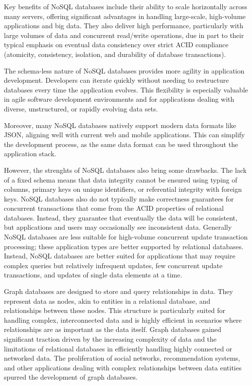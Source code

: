 Key benefits of NoSQL databases include their ability to scale horizontally across many servers, offering significant advantages in handling large-scale, high-volume applications and big data. They also deliver high performance, particularly with large volumes of data and concurrent read/write operations, due in part to their typical emphasis on eventual data consistency over strict ACID compliance (atomicity, consistency, isolation, and durability of database transactions).

The schema-less nature of NoSQL databases provides more agility in application development. Developers can iterate quickly without needing to restructure databases every time the application evolves. This flexibility is especially valuable in agile software development environments and for applications dealing with diverse, unstructured, or rapidly evolving data sets.

Moreover, many NoSQL databases natively support modern data formats like JSON, aligning well with current web and mobile applications. This can simplify the development process, as the same data format can be used throughout the application stack.

However, the strenghts of NoSQL databases also bring some drawbacks. The lack of a fixed schema means that data integrity cannot be ensured using typing of columns, primary keys on unique identifiers, or referential integrity with foreign keys. NoSQL databases also do not typically make correctness guarantees for concurrent transactions that come from the ACID properties of relational databases. Instead, they guarantee that eventually the data will be consistent, but applications and users may occasionally see inconsistent data. Generally NoSQL databases are less suitable for high-volume concurrent update transaction processing; these application types are better supported by relational databases. Instead, NoSQL databases are better suited for applications that may require complex queries but relatively infrequent updates, few concurrent update transactions, and updates of single data elements at a time.

Graph databases are designed to store and query relationships in data. They represent data as nodes, akin to entities in a relational database, and relationships between these nodes. This structure is particularly suited for handling complex, interconnected data and is highly efficient in scenarios where relationships are as important as the data itself. Graph databases gained significant traction driven by the increasing complexity of data and the limitations of relational databases in efficiently handling highly connected or networked data. The proliferation of social networks, recommendation systems, and other applications dealing with complex relationships between data entities spurred the development of graph databases.

